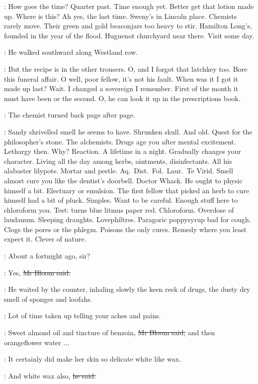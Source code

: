 \BloomInt:
How goes the time?
Quarter past.
Time enough yet.
Better get that lotion made up.
Where is this?
Ah yes, the last time.
Sweny's in Lincoln place.
Chemists rarely move.
Their green and gold beaconjars too heavy to stir.
Hamilton Long's, founded in the year of the flood.
Huguenot churchyard near there.
Visit some day.

:
He walked southward along Westland row.

\BloomInt:
But the recipe is in the other trousers.
O, and I forgot that latchkey too.
Bore
this funeral affair.
O well, poor fellow,
it's not his fault.
When was it I got it made up last?
Wait.
I changed a sovereign I remember.
First of the month it must have been
or the second.
O, he can look it up in the prescriptions book.

:
The chemist turned back page after page.

\BloomInt:
Sandy shrivelled smell he seems to have.
Shrunken skull.
And old.
Quest for the philosopher's stone.
The alchemists.
Drugs age you after mental excitement.
Lethargy then.
Why?
Reaction.
A lifetime in a night.
Gradually changes your character.
Living all the day among herbs, ointments, disinfectants.
All his alabaster lilypots.
Mortar and pestle.
Aq.\
Dist.\
Fol.\
Laur.\
Te Virid.
Smell almost cure you like the dentist's doorbell.
Doctor Whack.
He ought to physic himself a bit.
Electuary or emulsion.
The first fellow that picked an herb to cure himself had a bit of pluck.
Simples.
Want to be careful.
\gab{480}
Enough stuff here to chloroform you.
Test: turns blue litmus paper red.
Chloroform.
Overdose of laudanum.
Sleeping draughts.
Lovephiltres.
Paragoric poppysyrup bad for cough.
Clogs the pores or the phlegm.
Poisons the only cures.
Remedy where you least expect it.
Clever of nature.

\sweny:
About a fortnight ago, sir?

\Bloom:
Yes,
\sout{Mr Bloom said.}

:
He waited by the counter,
inhaling slowly the keen reek of drugs,
the dusty dry smell of sponges and loofahs.

\BloomInt:
Lot of time taken up telling your
aches and pains.

\Bloom:
Sweet almond oil and tincture of benzoin,
\sout{Mr Bloom said,}
and then orangeflower water ...

\BloomInt:
It certainly did make her skin so delicate white like wax.

\Bloom:
And white wax also,
\sout{he said.}

